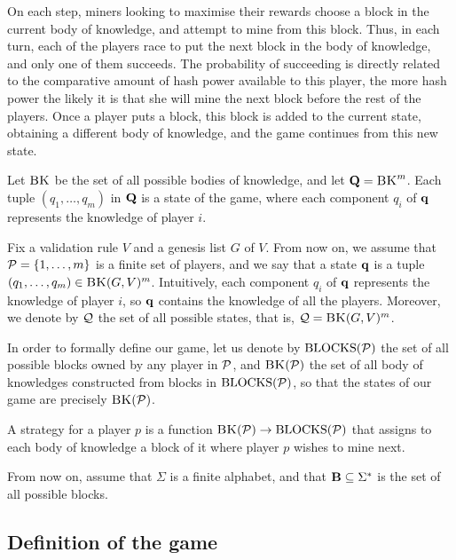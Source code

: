 \documentclass{article}
\begin{document}
On each step, miners looking to maximise their rewards choose a block in the current body of knowledge, and attempt to mine from this block. Thus, in each turn, each of the players race to put the next block in the body of knowledge, and only one of them succeeds. The probability of succeeding is directly related to the comparative amount of hash power available to this player, the more hash power the likely it is that she will mine the next block before the rest of the players. Once a player puts a block, this block is added to the current state, obtaining a different body of knowledge, and the game continues from this new state. 

Let $\text{\sc BK}$ be the set of all possible bodies of knowledge, and let $\mathbf{Q} = \text{\sc BK}^m$. Each tuple $(q_1, \ldots, q_m)$ in $\mathbf{Q}$ is a state of the game, where each component $q_i$ of $\mathbf{q}$ represents the knowledge of player $i$.


Fix a validation rule $V$ and a genesis list $G$ of $V$. From now on, we assume that $\mathcal{P} = \{1, \ldots, m\}$ is a finite set of players, and we say that a state $\mathbf{q}$ is a tuple $(q_1, \ldots, q_m) \in \text{\sc BK}(G,V)^m$. Intuitively, each component $q_i$ of $\mathbf{q}$ represents the knowledge of player $i$, so $\mathbf{q}$ contains the knowledge of all the players. Moreover, we denote by $\mathcal{Q}$ the set of all possible states, that is, $\mathcal{Q} = \text{\sc BK}(G,V)^m$.

In order to formally define our game, let us denote by $\text{BLOCKS}(\mathcal{P})$ the set of all possible blocks owned by any player in $\mathcal{P}$, and 
$\text{\sc BK}(\mathcal{P})$ the set of all body of knowledges constructed from blocks in $\text{BLOCKS}(\mathcal{P})$, so that the states of our game are precisely 
$\text{\sc BK}(\mathcal{P})$. 

A strategy for a player $p$ is a function $\text{\sc BK}(\mathcal{P}) \rightarrow \text{BLOCKS}(\mathcal{P})$ that assigns to each body of knowledge a block of it 
where player $p$ wishes to mine next. 

From now on, assume that $\Sigma$ is a finite alphabet, and that $\text{\bf B} \subseteq \Sigma^*$ is the set of all possible blocks.  




\subsection{Definition of the game}




\end{document}
